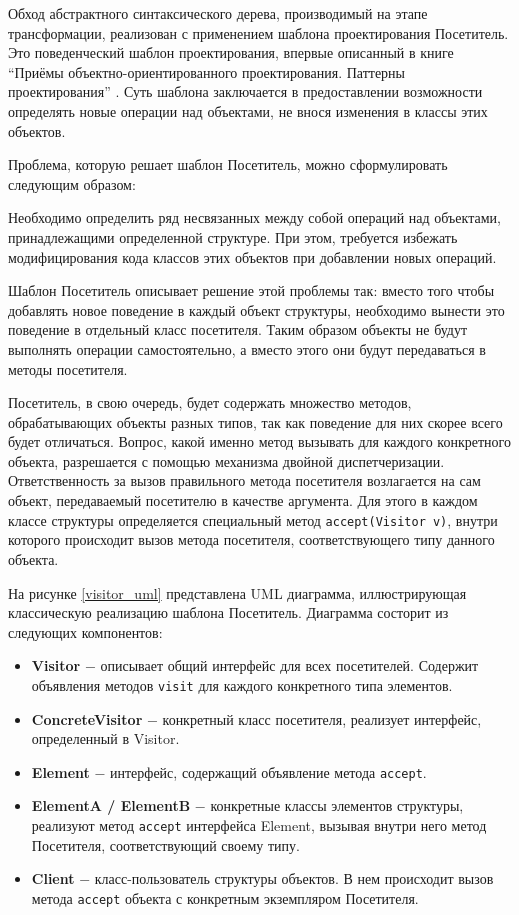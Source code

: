 \documentclass[14pt, a4paper]{article}
\def\code#1{\texttt{#1}} %
\begin{document}
Обход абстрактного синтаксического дерева, производимый на этапе трансформации, реализован с применением 
шаблона проектирования Посетитель. Это поведенческий шаблон проектирования, впервые описанный в книге 
``Приёмы объектно-ориентированного проектирования. Паттерны проектирования'' \cite{gang_of_4}.
Суть шаблона заключается в предоставлении возможности определять новые операции над объектами,
 не внося изменения в классы этих объектов.

Проблема, которую решает шаблон Посетитель, можно сформулировать следующим образом:

Необходимо определить ряд несвязанных между собой операций над объектами, принадлежащими определенной структуре.
При этом, требуется избежать модифицирования кода классов этих объектов при добавлении новых операций. 

Шаблон Посетитель описывает решение этой проблемы так:
вместо того чтобы добавлять новое поведение в каждый объект структуры, необходимо вынести это поведение 
в отдельный класс посетителя. Таким образом объекты не будут выполнять операции самостоятельно, а вместо этого 
они будут передаваться в методы посетителя.

Посетитель, в свою очередь, будет содержать множество методов, обрабатывающих объекты разных типов, так как
поведение для них скорее всего будет отличаться. Вопрос, какой именно метод вызывать для каждого конкретного объекта,
разрешается с помощью механизма двойной диспетчеризации. Ответственность за вызов правильного метода посетителя
возлагается на сам объект, передаваемый посетителю в качестве аргумента. Для этого в каждом классе структуры
определяется специальный метод \code{accept(Visitor v)}, внутри которого происходит вызов метода посетителя, соответствующего
типу данного объекта.

На рисунке \ref{visitor_uml} представлена UML диаграмма, иллюстрирующая классическую реализацию шаблона
Посетитель. Диаграмма состорит из следующих компонентов:
\begin{itemize}
  \item \textbf{Visitor} $-$ описывает общий интерфейс для всех посетителей. Содержит объявления 
    методов \code{visit} для каждого конкретного типа элементов. 
  \item \textbf{ConcreteVisitor} $-$ конкретный класс посетителя, реализует интерфейс, определенный в Visitor.
  \item \textbf{Element} $-$ интерфейс, содержащий объявление метода \code{accept}.
  \item \textbf{ElementA / ElementB} $-$ конкретные классы элементов структуры, реализуют метод \code{accept}
    интерфейса Element, вызывая внутри него метод Посетителя, соответствующий своему типу.
  \item \textbf{Client} $-$ класс-пользователь структуры объектов. В нем происходит вызов метода \code{accept}
    объекта с конкретным экземпляром Посетителя.
\end{itemize}
\end{document}
